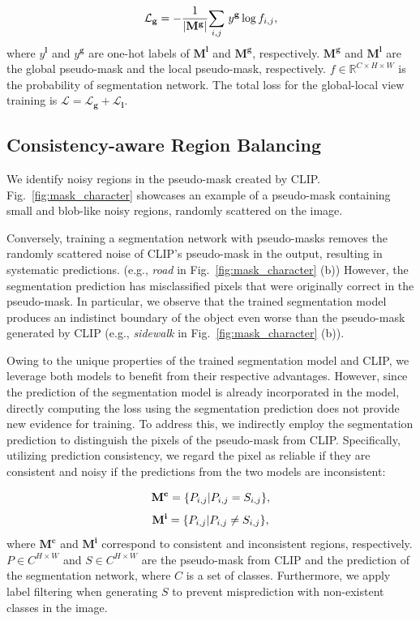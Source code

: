 \documentclass[letterpaper]{article} %
\def\eg{e.g.} \def\Eg{E.g.}
\begin{document}
\begin{equation}
\label{eq_loss_glo}
{\small
\mathcal{L}_\mathbf{g} = - \frac{1}{|\mathbf{M}^\mathbf{g}|} \underset{i,j}{\sum} \text{ } y^\mathbf{g} \log {f_{i,j}},
}
\end{equation}%
%
where $y^\mathbf{l}$ and $y^\mathbf{g}$ are one-hot labels of  $\mathbf{M}^\mathbf{l}$ and $\mathbf{M}^\mathbf{g}$, respectively. $\mathbf{M}^\mathbf{g}$ and $\mathbf{M}^\mathbf{l}$ are the global pseudo-mask and the local pseudo-mask, respectively. $f \in \mathbb{R}^{C \times H \times W}$ is the probability of segmentation network. The total loss for the global-local view training is $\mathcal{L} = \mathcal{L}_\mathbf{g} + \mathcal{L}_\mathbf{l}$.

\subsection{Consistency-aware Region Balancing} \label{sec:separation} 
We identify noisy regions in the pseudo-mask created by CLIP. Fig.~\ref{fig:mask_character} showcases an example of a pseudo-mask containing small and blob-like noisy regions, randomly scattered on the image.

Conversely, training a segmentation network with pseudo-masks removes the randomly scattered noise of CLIP's pseudo-mask in the output, resulting in systematic predictions. (\eg, \textit{road} in Fig.~\ref{fig:mask_character} (b)) However, the segmentation prediction has misclassified pixels that were originally correct in the pseudo-mask. In particular, we observe that the trained segmentation model produces an indistinct boundary of the object even worse than the pseudo-mask generated by CLIP (\eg, \textit{sidewalk} in Fig.~\ref{fig:mask_character} (b)).

Owing to the unique properties of the trained segmentation model and CLIP, we leverage both models to benefit from their respective advantages. However, since the prediction of the segmentation model is already incorporated in the model, directly computing the loss using the segmentation prediction does not provide new evidence for training. To address this, we indirectly employ the segmentation prediction to distinguish the pixels of the pseudo-mask from CLIP. Specifically, utilizing prediction consistency, we regard the pixel as reliable if they are consistent and noisy if the predictions from the two models are inconsistent:

\begin{equation}
\label{eq_region_con}
{\small
\mathbf{M}^\mathbf{c} = \{P_{i,j} | P_{i,j} = S_{i,j}\},
}
\end{equation}
\begin{equation}
\label{eq_region_inc}
{\small
\mathbf{M}^\mathbf{i} = \{P_{i,j} | P_{i,j} \neq S_{i,j}\},
}
\end{equation}%
%
where $\mathbf{M}^\mathbf{c}$ and $\mathbf{M}^\mathbf{i}$ correspond to consistent and inconsistent regions, respectively. $P \in C^{H \times W}$ and $S \in C^{H \times W}$ are the pseudo-mask from CLIP and the prediction of the segmentation network, where $C$ is a set of classes. Furthermore, we apply label filtering when generating $S$ to prevent misprediction with non-existent classes in the image. 
\end{document}

